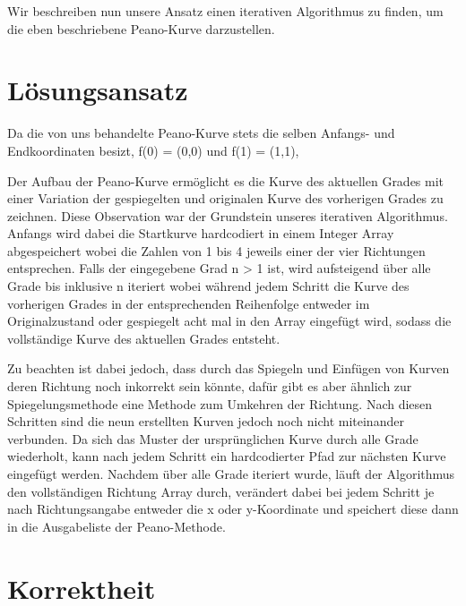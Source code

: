 \documentclass[course=asp]{aspdoc}
\begin{document}

Wir beschreiben nun unsere Ansatz einen iterativen Algorithmus zu finden, um die eben beschriebene Peano-Kurve darzustellen. %

\newpage

\section{Lösungsansatz}
Da die von uns behandelte Peano-Kurve stets die selben Anfangs- und Endkoordinaten besizt, f(0) = (0,0) und f(1) = (1,1), 

Der Aufbau der Peano-Kurve ermöglicht es die Kurve des aktuellen Grades mit einer Variation der gespiegelten und originalen Kurve des vorherigen Grades zu zeichnen.
Diese Observation war der Grundstein unseres iterativen Algorithmus. Anfangs wird dabei die Startkurve hardcodiert in einem Integer Array abgespeichert wobei die Zahlen von 1 bis 4 jeweils einer der vier Richtungen entsprechen. Falls der eingegebene Grad n > 1 ist, wird aufsteigend über alle Grade bis inklusive n iteriert wobei während jedem Schritt die Kurve des vorherigen Grades in der entsprechenden Reihenfolge entweder im Originalzustand oder gespiegelt acht mal in den Array eingefügt wird, sodass die vollständige Kurve des aktuellen Grades entsteht. 

Zu beachten ist dabei jedoch, dass durch das Spiegeln und Einfügen von Kurven deren Richtung noch inkorrekt sein könnte, dafür gibt es aber ähnlich zur Spiegelungsmethode eine Methode zum Umkehren der Richtung. Nach diesen Schritten sind die neun erstellten Kurven jedoch noch nicht miteinander verbunden. Da sich das Muster der ursprünglichen Kurve durch alle Grade wiederholt, kann nach jedem Schritt ein hardcodierter Pfad zur nächsten Kurve eingefügt werden.
Nachdem über alle Grade iteriert wurde, läuft der Algorithmus den vollständigen Richtung Array durch, verändert dabei bei jedem Schritt je nach Richtungsangabe entweder die x oder y-Koordinate und speichert diese dann in die Ausgabeliste der Peano-Methode.



\section{Korrektheit} %
\end{document}

